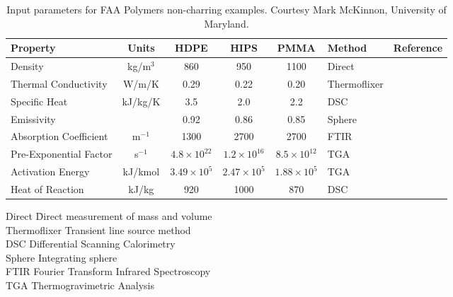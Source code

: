 \begin{table}[h!]
\caption[FAA Polymer Properties]{Input parameters for FAA Polymers non-charring examples. Courtesy Mark McKinnon, University of Maryland.}
\begin{tabular}{|l|c|c|c|c|l|l|}
\hline
Property                    & Units         & HDPE                  & HIPS                  & PMMA                  & Method                &  Reference                \\ \hline \hline
Density                     & kg/m$^3$      & 860                   & 950                   & 1100                  & Direct                &  \cite{Stoliarov:CF2009}  \\ \hline
Thermal Conductivity        & W/m/K         & 0.29                  & 0.22                  & 0.20                  & Thermoflixer          &  \cite{Stoliarov:CF2009}  \\ \hline
Specific Heat               & kJ/kg/K       & 3.5                   & 2.0                   & 2.2                   & DSC                   &  \cite{Stoliarov:PDS2008, Stoliarov:CF2009}  \\ \hline
Emissivity                  &               & 0.92                  & 0.86                  & 0.85                  & Sphere                &  \cite{Tsilingiris:ECM2003, Hallman:PES1974}  \\ \hline
Absorption Coefficient      & m$^{-1}$      & 1300                  & 2700                  & 2700                  & FTIR                  &  \cite{Tsilingiris:ECM2003, Hallman:PES1974}  \\ \hline
Pre-Exponential Factor      & s$^{-1}$      & $4.8 \times 10^{22}$  & $1.2 \times 10^{16}$  & $8.5 \times 10^{12}$  & TGA                   &  \cite{Stoliarov:PDS2008}  \\ \hline
Activation Energy           & kJ/kmol       & $3.49 \times 10^{5}$  & $2.47 \times 10^{5}$  & $1.88 \times 10^{5}$  & TGA                   &  \cite{Stoliarov:PDS2008}  \\ \hline
Heat of Reaction            & kJ/kg         & 920                   & 1000                  & 870                   & DSC                   &  \cite{Stoliarov:PDS2008}  \\ \hline
\end{tabular}
\label{FAA_Properties}
\end{table}

\begin{tabbing}
Direct  \hspace{0.5in}     \= Direct measurement of mass and volume \\
Thermoflixer               \> Transient line source method \\
DSC                        \> Differential Scanning Calorimetry \\
Sphere                     \> Integrating sphere \\
FTIR                       \> Fourier Transform Infrared Spectroscopy \\
TGA                        \> Thermogravimetric Analysis
\end{tabbing}

